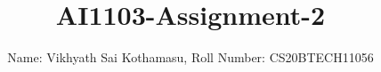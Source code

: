 \documentclass[journal,12pt,twocolumn]{IEEEtran}
\DeclareMathOperator*{\Res}{Res}
\begin{document}
\newcommand{\BEQA}{\begin{eqnarray}}
\newcommand{\EEQA}{\end{eqnarray}}
\newcommand{\define}{\stackrel{\triangle}{=}}

\raggedbottom
\setlength{\parindent}{0pt}
\providecommand{\mbf}{\mathbf}
\providecommand{\pr}[1]{\ensuremath{\Pr\left(#1\right)}}
\providecommand{\qfunc}[1]{\ensuremath{Q\left(#1\right)}}
\providecommand{\sbrak}[1]{\ensuremath{{}\left[#1\right]}}
\providecommand{\lsbrak}[1]{\ensuremath{{}\left[#1\right.}}
\providecommand{\rsbrak}[1]{\ensuremath{{}\left.#1\right]}}
\providecommand{\brak}[1]{\ensuremath{\left(#1\right)}}
\providecommand{\lbrak}[1]{\ensuremath{\left(#1\right.}}
\providecommand{\rbrak}[1]{\ensuremath{\left.#1\right)}}
\providecommand{\cbrak}[1]{\ensuremath{\left\{#1\right\}}}
\providecommand{\lcbrak}[1]{\ensuremath{\left\{#1\right.}}
\providecommand{\rcbrak}[1]{\ensuremath{\left.#1\right\}}}
\theoremstyle{remark}
\newtheorem{rem}{Remark}
\newcommand{\sgn}{\mathop{\mathrm{sgn}}}
\providecommand{\abs}[1]{\vert#1\vert}
\providecommand{\res}[1]{\Res\displaylimits_{#1}} 
\providecommand{\norm}[1]{\lVert#1\rVert}
\providecommand{\mtx}[1]{\mathbf{#1}}
\providecommand{\mean}[1]{E[ #1 ]}
\providecommand{\fourier}{\overset{\mathcal{F}}{ \rightleftharpoons}}
\providecommand{\system}{\overset{\mathcal{H}}{ \longleftrightarrow}}
\newcommand{\solution}{\noindent \textbf{Solution: }}
\newcommand{\cosec}{\,\text{cosec}\,}
\providecommand{\dec}[2]{\ensuremath{\overset{#1}{\underset{#2}{\gtrless}}}}
\newcommand{\myvec}[1]{\ensuremath{\begin{pmatrix}#1\end{pmatrix}}}
\newcommand{\mydet}[1]{\ensuremath{\begin{vmatrix}#1\end{vmatrix}}}
\makeatletter
{}
\makeatother
\let\StandardTheFigure\thefigure
\let\vec\mathbf
\renewcommand{\thefigure}{\theproblem}
\def\putbox#1#2#3{\makebox[0in][l]{\makebox[#1][l]{}\raisebox{\baselineskip}[0in][0in]{\raisebox{#2}[0in][0in]{#3}}}}
     \def\rightbox#1{\makebox[0in][r]{#1}}
     \def\centbox#1{\makebox[0in]{#1}}
     \def\topbox#1{\raisebox{-\baselineskip}[0in][0in]{#1}}
     \def\midbox#1{\raisebox{-0.5\baselineskip}[0in][0in]{#1}}
\vspace{3cm}
\title{AI1103-Assignment-2}
\author{Name: Vikhyath Sai Kothamasu, Roll Number: CS20BTECH11056}
\end{document}

